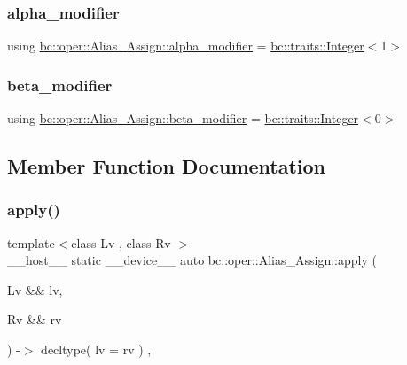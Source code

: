 \subsubsection{\texorpdfstring{alpha\+\_\+modifier}{alpha\_modifier}}
{\footnotesize\ttfamily using \hyperlink{structbc_1_1oper_1_1Alias__Assign_a5ae8d352adcc9c79c883b552bce7fb99}{bc\+::oper\+::\+Alias\+\_\+\+Assign\+::alpha\+\_\+modifier} =  \hyperlink{structbc_1_1traits_1_1Integer}{bc\+::traits\+::\+Integer}$<$1$>$}

\mbox{\label{structbc_1_1oper_1_1Alias__Assign_af1e9f3ff11a87bb8275be260d60f99e4}} 
\subsubsection{\texorpdfstring{beta\+\_\+modifier}{beta\_modifier}}
{\footnotesize\ttfamily using \hyperlink{structbc_1_1oper_1_1Alias__Assign_af1e9f3ff11a87bb8275be260d60f99e4}{bc\+::oper\+::\+Alias\+\_\+\+Assign\+::beta\+\_\+modifier} =  \hyperlink{structbc_1_1traits_1_1Integer}{bc\+::traits\+::\+Integer}$<$0$>$}



\subsection{Member Function Documentation}
\mbox{\label{structbc_1_1oper_1_1Alias__Assign_ae64d52d432b301777f6e22cd57eb67b0}} 
\subsubsection{\texorpdfstring{apply()}{apply()}}
{\footnotesize\ttfamily template$<$class Lv , class Rv $>$ \\
\+\_\+\+\_\+host\+\_\+\+\_\+ static \+\_\+\+\_\+device\+\_\+\+\_\+ auto bc\+::oper\+::\+Alias\+\_\+\+Assign\+::apply (\begin{DoxyParamCaption}\item[{Lv \&\&}]{lv,  }\item[{Rv \&\&}]{rv }\end{DoxyParamCaption}) -\/$>$ decltype( lv = rv ) \hspace{0.3cm}{\ttfamily [inline]}, {\ttfamily [static]}}


